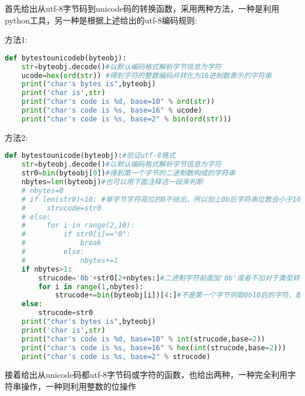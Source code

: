 \documentclass[twoside,11pt]{book}
\begin{document}
首先给出从utf-8字节码到unicode码的转换函数，采用两种方法，一种是利用python工具，另一种是根据上述给出的utf-8编码规则:

方法1:
\begin{lstlisting}[language=python]
def bytestounicodeb(byteobj):
    str=byteobj.decode()#以默认编码格式解析字节信息为字符
    ucode=hex(ord(str)) #得到字符的整数编码并转化为16进制数表示的字符串
    print("char's bytes is",byteobj)
    print('char is',str)
    print("char's code is %d, base=10" % ord(str))
    print("char's code is %s, base=16" % ucode)
    print("char's code is %s, base=2" % bin(ord(str)))
\end{lstlisting}

方法2:
\begin{lstlisting}[language=python]
def bytestounicode(byteobj):#验证utf-8格式
    str=byteobj.decode()#以默认编码格式解析字节信息为字符
    str0=bin(byteobj[0])#得到第一个字节的二进制数构成的字符串
    nbytes=len(byteobj)#也可以用下面注释这一段来判断
    # nbytes=0
    # if len(str0)<10: #单字节字符高位的0不给出，所以加上0b后字符串位数会小于10
    #     strucode=str0
    # else:
    #     for i in range(2,10):
    #         if str0[i]=="0":
    #             break
    #         else:
    #             nbytes+=1
    if nbytes>1:
        strucode='0b'+str0[2+nbytes:]#二进制字符前面加'0b'或者不加对于类型转换没有影响，这里为了显示效果加上它
        for i in range(1,nbytes):
            strucode+=bin(byteobj[i])[4:]#不是第一个字节则取0b10后的字符，即从第5个字符(第4个索引)开始
    else:
        strucode=str0
    print("char's bytes is",byteobj)
    print('char is',str)
    print("char's code is %d, base=10" % int(strucode,base=2))
    print("char's code is %s, base=16" % hex(int(strucode,base=2)))
    print("char's code is %s, base=2" % strucode)
\end{lstlisting}

接着给出从unicode码都utf-8字节码或字符的函数，也给出两种，一种完全利用字符串操作，一种则利用整数的位操作
\end{document}
